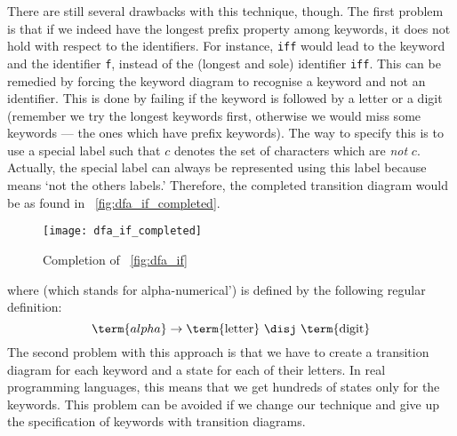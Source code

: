 There are still several drawbacks with this technique, though. The
first problem is that if we indeed have the longest prefix property
among keywords, it does not hold with respect to the identifiers. For
instance, \texttt{iff} would lead to the keyword  and the
identifier \texttt{f}, instead of the (longest and sole) identifier
\texttt{iff}. This can be remedied by forcing the keyword diagram to
recognise a keyword and not an identifier. This is done by failing if
the keyword is followed by a letter or a digit (remember we try the
longest keywords first, otherwise we would miss some keywords --- the
ones which have prefix keywords). The way to specify this is to use a
special label \compl such that \compl \(c\) denotes the set of
characters which are \emph{not} \(c\). Actually, the special label
\other can always be represented using this \compl label because
\other means `not the others labels.' Therefore, the completed
 transition diagram would be as found in
\fig~\vref{fig:dfa_if_completed}.
\begin{figure}
\centering
\texttt{[image: dfa\_if\_completed]}
\caption{Completion of \fig~\vref{fig:dfa_if}}
\label{fig:dfa_if_completed}
\end{figure}
where  (which stands for alpha-numerical') is defined by
the following regular definition:
\begin{equation*}
\term{alpha} \rightarrow \text{\term{letter} \disj \term{digit}}
\end{equation*}
The second problem with this approach is that we have to create a
transition diagram for each keyword and a state for each of their
letters. In real programming languages, this means that we get
hundreds of states only for the keywords. This problem can be avoided
if we change our technique and give up the specification of keywords
with transition diagrams.


